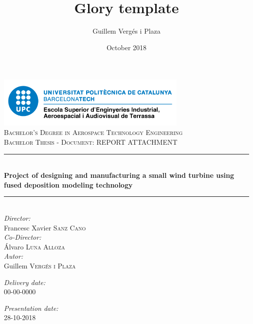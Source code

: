 \documentclass[11pt, a4paper, twoside]{book}
\title{Glory template}
\author{Guillem Vergés i Plaza }
\date{October 2018}
\newcommand\blankpage{%
	\null
	\thispagestyle{empty}%
	\addtocounter{page}{-1}%
	\newpage}
\begin{document}

\begin{titlepage}
\newcommand{\HRule}{\rule{\linewidth}{0.5mm}}
\center
\includegraphics[height=2.5cm]{Logo_escola.png}\\[2cm]

\textsc{\Large Bachelor's Degree in Aerospace Technology Engineering}\\[0.5cm]
\textsc{\large Bachelor Thesis - Document: REPORT ATTACHMENT}\\[0.5cm]
\HRule \\[0.4cm]
{\Large \bfseries Project of designing and manufacturing a small wind turbine using fused deposition modeling technology }\\[0.1cm]
\HRule \\[2cm]
\large \emph{Director:}\\[0.5cm] 
Francesc Xavier \textsc{Sanz Cano}\\
[1cm]
\large \emph{Co-Director:}\\[0.5cm] 
Álvaro \textsc{Luna Alloza}\\
[1.5cm]
\large \emph{Autor:}\\[0.5cm] 
Guillem \textsc{Vergés i Plaza}\\
[1cm]
\vfill


\afterpage{\blankpage}

\begin{minipage}{0.4\textwidth}
\begin{flushleft} \large
\emph{Delivery date:}\\[0.2cm] 00-00-0000
\end{flushleft}
\end{minipage}
\begin{minipage}{0.4\textwidth}
\begin{flushright} \large
\emph{Presentation date:}\\[0.2cm] 28-10-2018
\end{flushright}
\end{minipage}
\end{titlepage}
\end{document}

